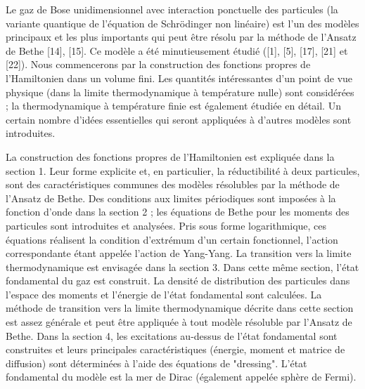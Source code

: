 {\color{red}Le gaz de Bose unidimensionnel avec interaction ponctuelle des particules (la variante quantique de l'équation de Schrödinger non linéaire)} est l'un des modèles principaux et les plus importants qui peut être résolu par la méthode de l'Ansatz de Bethe [14], [15]. Ce modèle a été minutieusement étudié ([1], [5], [17], [21] et [22]). {\color{red} Nous commencerons par la construction des fonctions propres de l'Hamiltonien dans un volume fini. Les quantités intéressantes d'un point de vue physique (dans la limite thermodynamique à température nulle) sont considérées ; la thermodynamique à température finie est également étudiée en détail. Un certain nombre d'idées essentielles qui seront appliquées à d'autres modèles sont introduites.}

{\color{red} La construction des fonctions propres de l'Hamiltonien est expliquée dans la section 1. Leur forme explicite et, en particulier, la réductibilité à deux particules, sont des caractéristiques communes des modèles résolubles par la méthode de l'Ansatz de Bethe. Des conditions aux limites périodiques sont imposées à la fonction d'onde dans la section 2 ; les équations de Bethe pour les moments des particules sont introduites et analysées. Pris sous forme logarithmique, ces équations réalisent la condition d'extrémum d'un certain fonctionnel, l'action correspondante étant appelée l'action de Yang-Yang. La transition vers la limite thermodynamique est envisagée dans la section 3. Dans cette même section, l'état fondamental du gaz est construit. La densité de distribution des particules dans l'espace des moments et l'énergie de l'état fondamental sont calculées. La méthode de transition vers la limite thermodynamique décrite dans cette section est assez générale et peut être appliquée à tout modèle résoluble par l'Ansatz de Bethe. Dans la section 4, les excitations au-dessus de l'état fondamental sont construites et leurs principales caractéristiques (énergie, moment et matrice de diffusion) sont déterminées à l'aide des équations de "dressing". L'état fondamental du modèle est la mer de Dirac (également appelée sphère de Fermi).}

